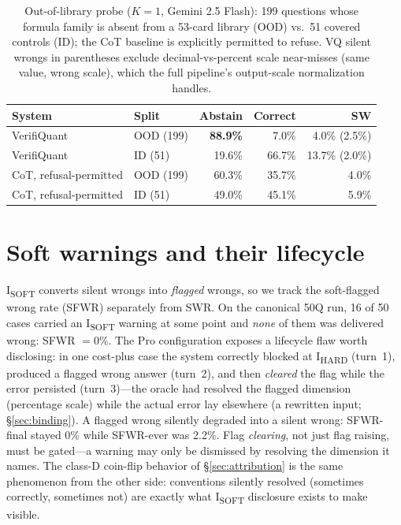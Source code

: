 \begin{table}[t]
\caption{Out-of-library probe ($K{=}1$, Gemini 2.5 Flash): 199 questions whose formula family is absent from a 53-card library (OOD) vs.\ 51 covered controls (ID); the CoT baseline is explicitly permitted to refuse. VQ silent wrongs in parentheses exclude decimal-vs-percent scale near-misses (same value, wrong scale), which the full pipeline's output-scale normalization handles.}
\label{tab:oodfam}
\small
\begin{tabular}{@{}llrrr@{}}
\toprule
System & Split & Abstain & Correct & SW \\
\midrule
VerifiQuant & OOD (199) & \textbf{88.9\%} & 7.0\% & 4.0\% (2.5\%) \\
VerifiQuant & ID (51) & 19.6\% & 66.7\% & 13.7\% (2.0\%) \\
CoT, refusal-permitted & OOD (199) & 60.3\% & 35.7\% & 4.0\% \\
CoT, refusal-permitted & ID (51) & 49.0\% & 45.1\% & 5.9\% \\
\bottomrule
\end{tabular}
\end{table}

\section{Soft warnings and their lifecycle}\label{sec:sfwr}
I\textsubscript{SOFT} converts silent wrongs into \emph{flagged} wrongs, so we track the soft-flagged wrong rate (SFWR) separately from SWR.
On the canonical 50Q run, 16 of 50 cases carried an I\textsubscript{SOFT} warning at some point and \emph{none} of them was delivered wrong: SFWR $=0\%$.
The Pro configuration exposes a lifecycle flaw worth disclosing: in one cost-plus case the system correctly blocked at I\textsubscript{HARD} (turn~1), produced a flagged wrong answer (turn~2), and then \emph{cleared} the flag while the error persisted (turn~3)---the oracle had resolved the flagged dimension (percentage scale) while the actual error lay elsewhere (a rewritten input; \S\ref{sec:binding}).
A flagged wrong silently degraded into a silent wrong: SFWR-final stayed 0\% while SFWR-ever was 2.2\%.
Flag \emph{clearing}, not just flag raising, must be gated---a warning may only be dismissed by resolving the dimension it names.
The class-D coin-flip behavior of \S\ref{sec:attribution} is the same phenomenon from the other side: conventions silently resolved (sometimes correctly, sometimes not) are exactly what I\textsubscript{SOFT} disclosure exists to make visible.

